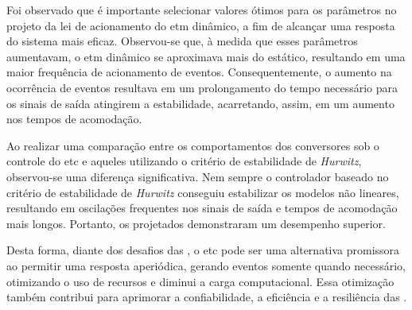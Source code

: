 Foi observado que é importante selecionar valores ótimos para os parâmetros no projeto da lei de acionamento do \acrshort{etm} dinâmico, a fim de alcançar uma resposta do sistema mais eficaz. Observou-se que, à medida que esses parâmetros aumentavam, o \acrshort{etm} dinâmico se aproximava mais do estático, resultando em uma maior frequência de acionamento de eventos. Consequentemente, o aumento na ocorrência de eventos resultava em um prolongamento do tempo necessário para os sinais de saída atingirem a estabilidade, acarretando, assim, em um aumento nos tempos de acomodação.

Ao realizar uma comparação entre os comportamentos dos conversores sob o controle do \acrshort{etc} e aqueles utilizando o critério de estabilidade de \textit{Hurwitz}, observou-se uma diferença significativa. Nem sempre o controlador baseado no critério de estabilidade de \textit{Hurwitz} conseguiu estabilizar os modelos não lineares, resultando em oscilações frequentes nos sinais de saída e tempos de acomodação mais longos. Portanto, os  projetados demonstraram um desempenho superior.

Desta forma, diante dos desafios das , o \acrshort{etc} pode ser uma alternativa promissora ao permitir uma resposta aperiódica, gerando eventos somente quando necessário, otimizando o uso de recursos e diminui a carga computacional. Essa otimização também contribui para aprimorar a confiabilidade, a eficiência e a resiliência das .